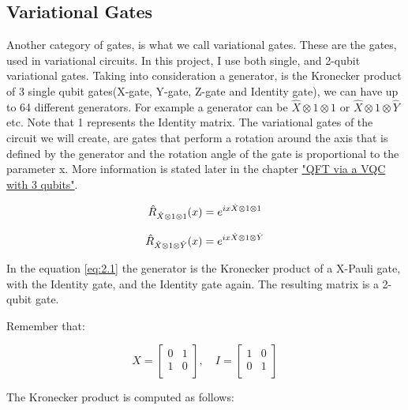 \documentclass[inscr,ack,preface]{diphdthesis}
\begin{document}
\subsection{Variational Gates}

Another category of gates, is what we call variational gates. These are the gates, used in variational circuits. In this project, I use both single, and 2-qubit variational gates. Taking into consideration a generator, is the Kronecker product of 3 single qubit gates(X-gate, Y-gate, Z-gate and Identity gate), we can have up to 64 different generators. For example a generator can be $\hat{X}\otimes 1\otimes1$ or $\hat{X}\otimes 1\otimes \hat{Y}$ etc. Note that 1 represents the Identity matrix. The variational gates of the circuit we will create, are gates that perform a rotation around the axis that is defined by the generator and the rotation angle of the gate is proportional to the parameter x. More information is stated later in the chapter \hyperref[sec:qft_vqc]{"QFT via a VQC with 3 qubits"}.

\begin{center}
\begin{equation}  
\Large\hat{R}_{\hat{X}\otimes 1\otimes1}(x)=e^{i x \hat{X}\otimes 1\otimes1}\label{eq:2.1}
\end{equation}

\begin{equation} 
\Large\hat{R}_{\hat{X}\otimes 1\otimes \hat{Y}}(x)=e^{i x \hat{X}\otimes 1\otimes\hat{Y}}\label{eq:2.2}
\end{equation}

\end{center}

In the equation {\ref{eq:2.1}} the generator is the Kronecker product of a X-Pauli gate, with the Identity gate, and the Identity gate again. The resulting matrix is a 2-qubit gate.

Remember that: 

\[
X = \begin{bmatrix}
0 & 1 \\
1 & 0 \\
\end{bmatrix},
\quad
I = \begin{bmatrix}
1 & 0 \\
0 & 1 \\
\end{bmatrix}
\]

The Kronecker product is computed as follows:\\
\end{document}
